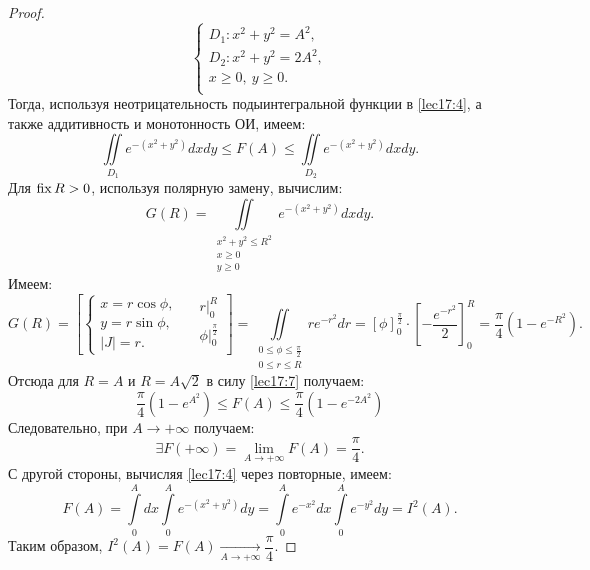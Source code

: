 \documentclass[../../main.tex]{subfiles}
\begin{document}
\begin{proof}
     \begin{equation}
		 	\label{lec17:6}
            \begin{cases}
                D_1 : x^2 + y^2 = A^2,\\
                D_2 : x^2 + y^2 = 2A^2,\\
                x \geq 0,\ y \geq 0.\\
            \end{cases}
		\end{equation}
  Тогда, используя неотрицательность подыинтегральной 
  функции в \eqref{lec17:4}, а также аддитивность и монотонность ОИ, имеем:
	\begin{equation}
		\label{lec17:7}
		\iint\limits_{D_1}e^{-(x^2 + y^2)}dxdy \leq F(A) \leq
		\iint\limits_{D_2}e^{-(x^2 + y^2)}dxdy.
	\end{equation}
    Для $\operatorname{fix} R > 0$, используя полярную замену, вычислим:
	\begin{equation}
        \label{lec17:8}
		G(R) = \iint\limits_{\substack{
		x^2 + y^2 \leq R^2 \\
		x \geq 0 \\
		y \geq 0
		}}e^{-(x^2 + y^2)}dxdy.
	\end{equation}
	Имеем:
    \begin{equation*}
        G(R) =
        \left[
		\left\{
        \begin{gathered} 
        x = r \cos \phi,\\
        y = r \sin \phi,\\
        |J| = r.
        \end{gathered}
        \right. \quad
        \begin{gathered}
        r\vert_0^R\\
		\phi \vert_0^{\frac{\pi}{2}}\\
        \end{gathered}
        \right]
        = \iint\limits_{\substack{0\leq\phi\leq \frac{\pi}{2}\\
				0 \leq r \leq R}}r e^{-r^2}dr =
        \left[ \phi \right]_0^{\frac{\pi}{2}} \cdot
        \left[ -\frac{e^{-r^2}}{2} \right]_0^{R} =
        \frac{\pi}{4}(1 - e^{-R^2}).
	\end{equation*}
	Отсюда для $R = A$ и $R = A\sqrt{2}$ в силу \eqref{lec17:7} получаем:
	\begin{equation}
	 \frac{\pi}{4}(1 - e^{A^2}) \leq F(A) \leq
	 \frac{\pi}{4}(1 - e^{-2A^2})
	\end{equation}
    Следовательно, при $A \to +\infty$ получаем:
    \begin{equation}
    \exists F(+\infty)=\lim\limits_{A\to+\infty}F(A) = \frac{\pi}{4}.
    \end{equation}
    С другой стороны, вычисляя \eqref{lec17:4} через повторные, имеем:
    \begin{equation*}
     F(A)= \int\limits_0^{A}dx\int\limits_0^{A}e^{-(x^2+y^2)}dy = 
     \int\limits_0^{A}e^{-x^2}dx \int\limits_0^{A}e^{-y^2}dy = I^2(A).
    \end{equation*}
    Таким образом, $I^2(A) =
    F(A) \xrightarrow[A\to +\infty]{} \dfrac{\pi}{4}$.
    

\end{proof}
\end{document}
